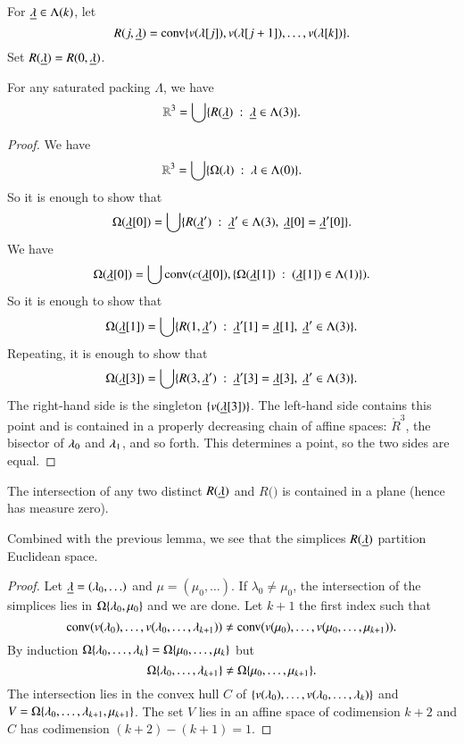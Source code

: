 For ${\underline{\lambda}}\in\Lambda(k)$, let 
$$R(j,{\underline{\lambda}}) = {\operatorname{conv}}\{v(\lambda[j]), v(\lambda[j+1]),\ldots,v(\lambda[k])\}.$$  Set $R({\underline{\lambda}})=R(0,{\underline{\lambda}})$.


\begin{lemma} 
For any saturated packing $\Lambda$, we have
$$\mathbb{R}^3 = \bigcup \{ R({\underline{\lambda}}) \ :\  {\underline{\lambda}}\in \Lambda(3)\}.$$
\end{lemma}

\begin{proof}
We have $$\mathbb{R}^3 = \bigcup \{\Omega(\lambda)\ :\  \lambda\in \Lambda(0)\}.$$
So it is enough to show that
$$\Omega({\underline{\lambda}}[0]) = \bigcup \{ R({\underline{\lambda}}') \ :\  {\underline{\lambda}}'\in \Lambda(3),~{\underline{\lambda}}[0]={\underline{\lambda}}'[0]\}.$$
We have
$$\Omega({\underline{\lambda}}[0]) = \bigcup {\operatorname{conv}}(c({\underline{\lambda}}[0]),\{\Omega({\underline{\lambda}}[1])\ :\  ({\underline{\lambda}}[1])\in \Lambda(1)\}).$$
So it is enough to show that
$$\Omega({\underline{\lambda}}[1]) = \bigcup \{ R(1,{\underline{\lambda}}') \ :\  {\underline{\lambda}}'[1]={\underline{\lambda}}[1],~{\underline{\lambda}}'\in \Lambda(3)\}.$$
Repeating, it is enough to show that
$$\Omega({\underline{\lambda}}[3]) = \bigcup\{R(3,{\underline{\lambda}}')\ :\ {\underline{\lambda}}'[3]={\underline{\lambda}}[3],~{\underline{\lambda}}'\in\Lambda(3)\}.$$
The right-hand side is the singleton $\{v({\underline{\lambda}}[3])\}$.  The left-hand side
contains this point and is contained in a properly decreasing chain of affine spaces:
$\ring{R}^3$, the bisector of $\lambda_0$ and $\lambda_1$, and so forth.  This determines a point,
so the two sides are equal.
\end{proof}

\begin{lemma}  The intersection of any two distinct $R({\underline{\lambda}})$ and $R(\bm)$ is
contained in a plane (hence has measure zero).
\end{lemma}

Combined with the previous lemma, we see that the simplices $R({\underline{\lambda}})$ partition Euclidean
space.

\begin{proof}  Let ${\underline{\lambda}} = (\lambda_0,\ldots)$ and $\mu = (\mu_0,\ldots)$.
If $\lambda_0\ne\mu_0$, the intersection of the simplices lies in $\Omega\{\lambda_0,\mu_0\}$
and we are done.  Let $k+1$ the first index such that
$${\operatorname{conv}}(v(\lambda_0),\ldots,v(\lambda_0,\ldots,\lambda_{k+1}))\ne
{\operatorname{conv}}(v(\mu_0),\ldots,v(\mu_0,\ldots,\mu_{k+1})).
$$
By induction $\Omega\{\lambda_0,\ldots,\lambda_k\} = \Omega\{\mu_0,\ldots,\mu_k\}$
but
$$\Omega\{\lambda_0,\ldots,\lambda_{k+1}\} \ne \Omega\{\mu_0,\ldots,\mu_{k+1}\}.$$
The intersection lies in the convex hull $C$ of
$\{v(\lambda_0),\ldots,v(\lambda_0,\ldots,\lambda_k)\}$ and
$V=\Omega\{\lambda_0,\ldots,\lambda_{k+1},\mu_{k+1}\}$.  The set $V$ lies in an affine space of 
codimension $k+2$
and $C$ has codimension $(k+2) - (k+1) = 1$.
\end{proof}

